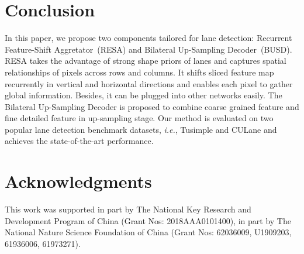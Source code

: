 \documentclass[letterpaper]{article} \usepackage{aaai21}  \usepackage{times}  \usepackage{helvet} \usepackage{courier}  \usepackage[hyphens]{url}  \usepackage{graphicx} \urlstyle{rm} \def\UrlFont{\rm}  \usepackage{natbib}  \usepackage{caption} \frenchspacing  \setlength{\pdfpagewidth}{8.5in}  \setlength{\pdfpageheight}{11in}  \usepackage{amsmath}
\begin{document}
\section{Conclusion}
In this paper, we propose two components tailored for lane detection: Recurrent Feature-Shift Aggretator~(RESA) and Bilateral Up-Sampling Decoder~(BUSD). RESA takes the advantage of strong shape priors of lanes and captures spatial relationships of pixels across rows and columns. It shifts sliced feature map recurrently in vertical and horizontal directions and enables each pixel to gather global information. Besides, it can be plugged into other networks easily. The Bilateral Up-Sampling Decoder is proposed to combine coarse grained feature and fine detailed feature in up-sampling stage. Our method is evaluated on two popular lane detection benchmark datasets, \emph{i.e.}, Tusimple and CULane and achieves the state-of-the-art performance.


\section*{Acknowledgments}
This work was supported in part by The National Key Research and Development Program of China (Grant Nos: 2018AAA0101400), in part by The National Nature Science Foundation of China (Grant Nos: 62036009, U1909203, 61936006, 61973271).


\end{document}
